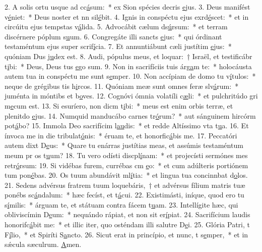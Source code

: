 2. A solis ortu usque ad cc\uline{á}sum:~* ex Sion spécies decris \uline{e}jus.
3. Deus manifést v\uline{é}niet:~* Deus noster et nn sil\uline{é}bit.
4. Ignis in conspéctu ejus exrd\uline{é}scet:~* et in circúitu ejus tempstas v\uline{á}lida.
5. Advocábit cælum ds\uline{ú}rsum:~* et terram discérnere póplum s\uline{u}um.
6. Congregáte illi sancts \uline{e}jus:~* qui órdinant testaméntum ejus super scrif\uline{í}cia.
7. Et annuntiábunt cæli justítim \uline{e}jus:~* quóniam Dus j\uline{u}dex est.
8. Audi, pópulus meus, et loquar:~† Israël, et testificábr t\uline{i}bi:~* Deus, Deus tus \uline{e}go sum.
9. Non in sacrifíciis tuis árg\uline{a}m te:~* holocáusta autem tua in conspéctu me sunt s\uline{e}mper.
10. Non accípiam de domo tu v\uline{í}tulos:~* neque de grégibus tis h\uline{i}rcos.
11. Quóniam meæ sunt omnes feræ slv\uline{á}rum:~* juménta in móntibs et b\uline{o}ves.
12. Cognóvi ómnia volatíli c\uline{æ}li:~* et pulchritúdo gri m\uline{e}cum est.
13. Si esuríero, non dicm t\uline{i}bi:~* meus est enim orbis terræ, et plenitdo \uline{e}jus.
14. Numquid manducábo carnes tr\uline{ó}rum?~* aut sánguinem hircórm pot\uline{á}bo?
15. Immola Deo sacrifícim l\uline{au}dis:~* et redde Altíssimo vta t\uline{u}a.
16. Et ínvoca me in die tribulat\uline{ó}nis:~* éruam te, et honorfic\uline{á}bis me.
17. Peccatóri autem dixt D\uline{e}us:~* Quare tu enárras justítias meas, et assúmis testaméntum meum pr os t\uline{u}um?
18. Tu vero odísti discpl\uline{í}nam:~* et projecísti sermónes mes retr\uline{ó}rsum:
19. Si vidébas furem, currébas cm \uline{e}o:~* et cum adúlteris portiónem tum pon\uline{é}bas.
20. Os tuum abundávit ml\uline{í}tia:~* et lingua tua concinnbat d\uline{o}los.
21. Sedens advérsus fratrem tuum loquebáris,~† et advérsus fílium matris tuæ ponébs sc\uline{á}ndalum:~* hæc fecíst, et t\uline{á}cui.
22. Existimásti, iníque, quod ero tu s\uline{í}milis:~* árguam te, et státuam contra fácem t\uline{u}am.
23. Intellígite hæc, qui obliviscímin D\uline{e}um:~* nequándo rápiat, et non sit  er\uline{í}piat.
24. Sacrifícium laudis honorifc\uline{á}bit me:~* et illic iter, quo osténdam illi salutre D\uline{e}i.
25. Glória Patri, t F\uline{í}lio,~* et Spiríti S\uline{a}ncto.
26. Sicut erat in princípio, et nunc, t s\uline{e}mper,~* et in sǽcula sæculrum. \uline{A}men.
